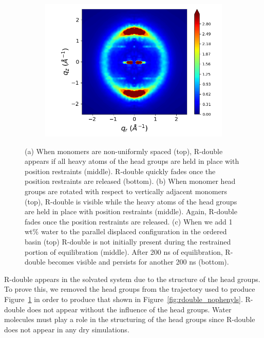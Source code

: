 \documentclass[journal=jpcbfk,manuscript=article]{achemso}
\begin{document}
\begin{figure}[!htb]
\begin{subfigure}{0.3\linewidth}
  \end{subfigure}
  \begin{subfigure}{0.3\linewidth}
  	\centering
  	\includegraphics[width=\textwidth]{solvated_offset_rzplot_1.png}
  	\caption{}\label{fig:solvated_pore_rzplot_norestraints}
  \end{subfigure}
  \caption{(a) When monomers are non-uniformly spaced (top), R-double appears if all heavy atoms
  of the head groups are held in place with position restraints (middle). R-double quickly fades once 
  the position restraints are released (bottom). (b) When monomer head groups are rotated with respect
  to vertically adjacent monomers (top), R-double is visible while the heavy atoms of the head groups
  are held in place with position restraints (middle). Again, R-double fades once the position 
  restraints are released. (c) When we add 1 wt\% water to the parallel displaced configuration in the
  ordered basin (top) R-double is not initially present during the restrained portion of equilibration (middle).
  After 200 ns of equilibration, R-double becomes visible and persists for another 200 ns (bottom).}\label{fig:rdouble}
  \end{figure}

  R-double appears in the solvated system due to the structure of the head groups. To prove this,
  we removed the head groups from the trajectory used to produce Figure~\ref{fig:solvated_pore_rzplot_norestraints}
  in order to produce that shown in Figure~\ref{fig:rdouble_nophenyls}. R-double does not appear
  without the influence of the head groups. Water molecules must play a role in the structuring
  of the head groups since R-double does not appear in any dry simulations.
\end{document}
